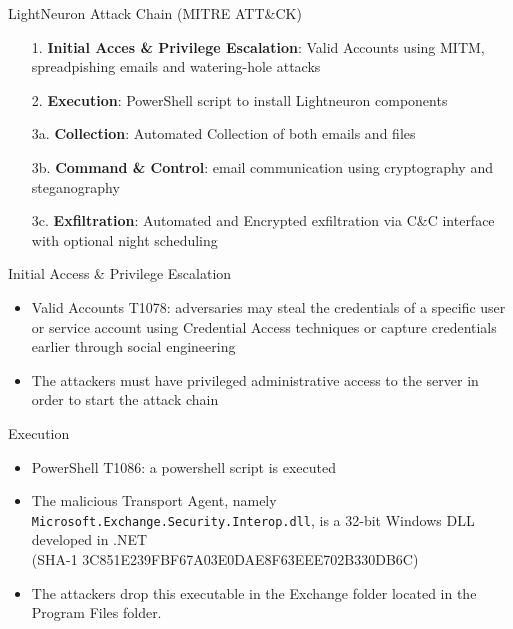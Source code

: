 \begin{frame}[fragile]{LightNeuron Attack Chain (MITRE ATT\&CK)}
    
    \begin{enumerate}
        \item[1.] \textbf{Initial Acces \& Privilege Escalation}: Valid Accounts using MITM, spreadpishing emails and watering-hole attacks
        \item[2.] \textbf{Execution}: PowerShell script to install Lightneuron components
        \item[3a.] \textbf{Collection}: Automated Collection of both emails and files
        \item[3b.] \textbf{Command \& Control}: email communication using cryptography and steganography
        \item[3c.] \textbf{Exfiltration}: Automated and Encrypted exfiltration via C\&C interface with optional night scheduling
    \end{enumerate}
\end{frame}

\begin{frame}[fragile]{Initial Access \& Privilege Escalation}
    \begin{itemize}
        \item Valid Accounts T1078: adversaries may steal the credentials of a 
        specific user or service account using Credential Access techniques
         or capture credentials earlier through social engineering \cite{MitreTechniques}
        \item The attackers must have privileged administrative access to 
        the server in order to start the attack chain 
    \end{itemize}
\end{frame}

\begin{frame}[fragile]{Execution}
    \begin{itemize}
        \item PowerShell T1086: a powershell script is executed
        \item The malicious Transport Agent, namely \texttt{Microsoft.Exchange.Security.Interop.dll}, is a 32-bit Windows DLL developed in .NET \\(SHA-1 3C851E239FBF67A03E0DAE8F63EEE702B330DB6C)
        \item The attackers drop this executable in the Exchange folder located in the 
        Program Files folder.  
    \end{itemize}
\end{frame}

